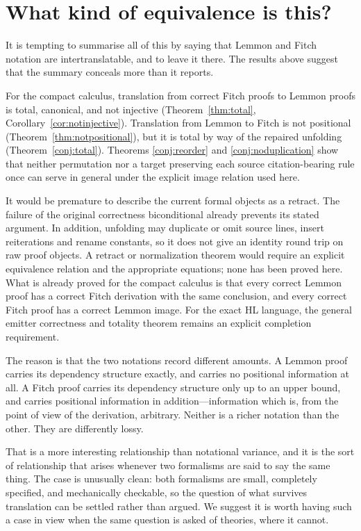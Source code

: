 \documentclass[11pt]{article}
\theoremstyle{plain}
\theoremstyle{definition}
\theoremstyle{remark}
\begin{document}
\section{What kind of equivalence is this?}\label{sec:equivalence}

It is tempting to summarise all of this by saying that Lemmon and Fitch
notation are intertranslatable, and to leave it there. The results above
suggest that the summary conceals more than it reports.

For the compact calculus, translation from correct Fitch proofs to Lemmon
proofs is total, canonical,
and not injective (Theorem~\ref{thm:total},
Corollary~\ref{cor:notinjective}). Translation from Lemmon to Fitch is not
positional (Theorem~\ref{thm:notpositional}), but it is total by way of the
repaired unfolding (Theorem~\ref{conj:total}). Theorems
\ref{conj:reorder} and \ref{conj:noduplication} show that neither permutation
nor a target preserving each source citation-bearing rule once can serve in
general under the explicit image relation used here.

It would be premature to describe the current formal objects as a retract.
The failure of the original correctness biconditional already prevents its
stated argument. In addition, unfolding may duplicate or omit source lines,
insert reiterations and rename constants, so it does not give an identity
round trip on raw proof objects. A retract or normalization theorem would
require an explicit equivalence relation and the appropriate equations; none
has been proved here. What is already proved for the compact calculus is that
every correct Lemmon proof has a correct Fitch derivation with the same
conclusion, and every correct Fitch proof has a correct Lemmon image. For the
exact HL language, the general emitter correctness and totality theorem
remains an explicit completion requirement.

The reason is that the two notations record different amounts. A Lemmon proof
carries its dependency structure exactly, and carries no positional
information at all. A Fitch proof carries its dependency structure only up to
an upper bound, and carries positional information in addition---information
which is, from the point of view of the derivation, arbitrary. Neither is a
richer notation than the other. They are differently lossy.

That is a more interesting relationship than notational variance, and it is
the sort of relationship that arises whenever two formalisms are said to say
the same thing. The case is unusually clean: both formalisms are small,
completely specified, and mechanically checkable, so the question of what
survives translation can be settled rather than argued. We suggest it is worth
having such a case in view when the same question is asked of theories, where
it cannot.
\end{document}
